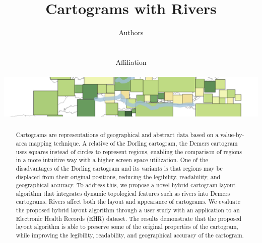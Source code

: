 \documentclass{egpubl}
\begin{document}
\author[Authors]
{
\parbox{\textwidth}{\centering Authors }
\\
\parbox{\textwidth}{\centering Affiliation \\ \begin{center}
        \vspace{2em}
        \includegraphics[width=\textwidth,keepaspectratio]{figure/cover.png}
    \end{center}
}
}

\title{Cartograms with Rivers}

\pagestyle{plain}

\maketitle

\begin{abstract}
    Cartograms are representations of geographical and abstract data based on a value-by-area mapping technique. A relative of the Dorling cartogram, the Demers cartogram uses squares instead of circles to represent regions, enabling the comparison of regions in a more intuitive way with a higher screen space utilization. One of the disadvantages of the Dorling cartogram and its variants is that regions may be displaced from their original positions, reducing the legibility, readability, and geographical accuracy. To address this, we propose a novel hybrid cartogram layout algorithm that integrates dynamic topological features such as rivers into Demers cartograms. Rivers affect both the layout and appearance of cartograms. We evaluate the proposed hybrid layout algorithm through a user study with an application to an Electronic Health Records (EHR) dataset. The results demonstrate that the proposed layout algorithm is able to preserve some of the original properties of the cartogram, while improving the legibility, readability, and geographical accuracy of the cartogram.
\end{abstract}
\end{document}
